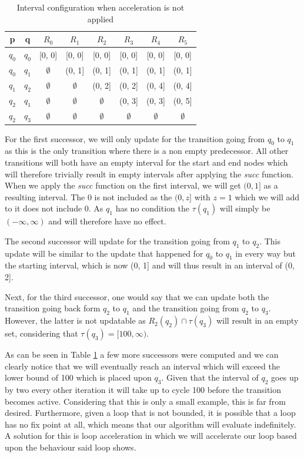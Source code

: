 \documentclass[12pt]{article}
\begin{document}
\begin{table}[h]
	\begin{tabular}{ |c|c|c|c|c|c|c|c| }
		\hline
		p		& q 	& $R_0$ 		& $R_1$			& $R_2$			& $R_3$			& $R_4$ 		& $R_5$ \\
		\hline
		$q_0$	& $q_0$ & [0, 0] 		& [0, 0] 		& [0, 0] 		& [0, 0]		& [0, 0]		& [0, 0] \\
		$q_0$	& $q_1$ & $\emptyset$ 	& (0, 1]		& (0, 1] 		& (0, 1]		& (0, 1] 		& (0, 1] \\
		$q_1$	& $q_2$ & $\emptyset$ 	& $\emptyset$ 	& (0, 2] 		& (0, 2]		& (0, 4] 		& (0, 4] \\
		$q_2$	& $q_1$ & $\emptyset$ 	& $\emptyset$ 	& $\emptyset$	& (0, 3]		& (0, 3] 		& (0, 5] \\
		$q_2$	& $q_3$ & $\emptyset$ 	& $\emptyset$ 	& $\emptyset$	& $\emptyset$	& $\emptyset$	& $\emptyset$ \\
		\hline
	\end{tabular}
	\centering
	\caption{Interval configuration when acceleration is not applied}
	\label{table:table_example_succ}
\end{table}

For the first successor, we will only update for the transition going from $q_0$ to $q_1$ as this is the only transition where there is a non empty predecessor. All other transitions will both have an empty interval for the start and end nodes which will therefore trivially result in empty intervals after applying the \textit{succ} function. When we apply the \textit{succ} function on the first interval, we will get $(0, 1]$ as a resulting interval. The 0 is not included as the $(0,z]$ with $z=1$ which we will add to it does not include 0. As $q_1$ has no condition the $\tau(q_1)$ will simply be $(-\infty, \infty)$ and will therefore have no effect.

The second successor will update for the transition going from $q_1$ to $q_2$. This update will be similar to the update that happened for $q_0$ to $q_1$ in every way but the starting interval, which is now (0, 1] and will thus result in an interval of (0, 2].

Next, for the third successor, one would say that we can update both the transition going back form $q_2$ to $q_1$ and the transition going from $q_2$ to $q_3$. However, the latter is not updatable as $R_2(q_2) \cap \tau(q_3)$ will result in an empty set, considering that $\tau(q_3) = [100, \infty)$.

As can be seen in Table \ref{table:table_example_succ} a few more successors were computed and we can clearly notice that we will eventually reach an interval which will exceed the lower bound of 100 which is placed upon $q_3$. Given that the interval of $q_2$ goes up by two every other iteration it will take up to cycle 100 before the transition becomes active. Considering that this is only a small example, this is far from desired. Furthermore, given a loop that is not bounded, it is possible that a loop has no fix point at all, which means that our algorithm will evaluate indefinitely. A solution for this is loop acceleration in which we will accelerate our loop based upon the behaviour said loop shows. 
\end{document}
